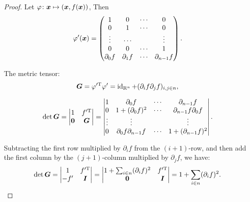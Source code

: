\documentclass[openany]{book}
\begin{document}
\begin{proof}
	Let $\varphi \colon \boldsymbol{x} \mapsto (\boldsymbol{x}, f(\boldsymbol{x}))$, Then
	\begin{equation*}
		\varphi'(\boldsymbol{x}) = 
		\begin{pmatrix}
			1 & 0 & \cdots & 0 \\
			0 & 1 & \cdots & 0 \\
			\vdots & \cdots & & \vdots \\
			0 & 0 & \cdots & 1 \\
			\partial_0 f & \partial_1 f & \cdots & \partial_{n-1} f
		\end{pmatrix}.
	\end{equation*}
	
	The metric tensor:
	\begin{equation*}
		\boldsymbol{G} = \varphi'^{\mathrm T}\varphi' = \operatorname{id}_{\mathrm R^n} + (\partial_i f \partial_j f)_{i, j \in n},
	\end{equation*}
	 
	\begin{align*}
		\det \boldsymbol{G} = 
		\begin{vmatrix}
			1 & f'^{\mathrm T} \\
			\boldsymbol{0} & \boldsymbol{G}
		\end{vmatrix}
		= \begin{vmatrix}
			1 & \partial_0 f & \cdots & \partial_{n-1} f \\
			0 & 1 + (\partial_0 f)^2 & \cdots & \partial_{n-1} f \partial_0 f \\
			\vdots & \vdots & & \vdots \\
			0 & \partial_0 f \partial_{n-1} f & \cdots & 1 + (\partial_{n-1} f)^2 
		\end{vmatrix}.
	\end{align*}

	Subtracting the first row multiplied by $\partial_i f$ from the $(i + 1)$-row, and then add the first column by the $(j+1)$-column multiplied by $\partial_j f$, we have:
	\begin{equation*}
		\det \boldsymbol{G} = \begin{vmatrix}
			1 & f'^{\mathrm T} \\
			-f' & \boldsymbol{I}
		\end{vmatrix}
		= \begin{vmatrix}
			1 + \sum_{i \in n} (\partial_i f)^2 & f'^{\mathrm T} \\
			\boldsymbol{0} & \boldsymbol{I}
		\end{vmatrix}
		= 1 + \sum_{i \in n} (\partial_i f)^2.
	\end{equation*} 
\end{proof}
\end{document}
